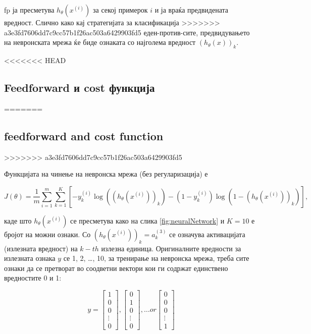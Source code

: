 fp ја пресметува $h_\theta(x^{(i)})$ за секој примерок $i$ и ја враќа
предвидената вредност. Слично како кај стратегијата за класификација
>>>>>>> a3e3fd7606dd7c9cc57b1f26ac503a6429903fd5
еден-против-сите, предвидувањето на невронската мрежа ќе биде ознаката со
најголема вредност $(h_\theta(x))_k$.




<<<<<<< HEAD
\subsection{Feedforward и cost функција}
=======
\subsection{feedforward and cost function}
>>>>>>> a3e3fd7606dd7c9cc57b1f26ac503a6429903fd5

Функцијата на чинење на невронска мрежа (без регуларизација) е

\[
	J(\theta) = \frac{1}{m}\sum_{i = 1}^{m}\sum_{k =
	1}^{K}[-y^{(i)}_k\log((h_\theta(x^{(i)}))_k) -
	(1 - y^{(i)}_k)\log(1 - (h_\theta(x^{(i)}))_k)],
\]

каде што $h_\theta(x^{(i)})$ се пресметува како на слика \ref{fig:neuralNetwork}
 и $K = 10$ е бројот на можни ознаки. Со $(h_\theta(x^{(i)}))_k = a^{(3)}_k$ се
 означува активацијата (излезната вредност) на $k-th$ излезна единица.
 Оригиналните вредности за излезната ознака $y$ се 1, 2, \ldots, 10, за
 тренирање на невронска мрежа, треба сите ознаки да се претворат во соодветни
 вектори кои ги содржат единствено вредностите 0 и 1:
 
 \[	
	y = \begin{bmatrix}
		    1 \\
			0 \\
			0 \\
			\vdots \\
			0
			
		\end{bmatrix},
		\begin{bmatrix}
		    0 \\
			1 \\
			0 \\
			\vdots \\
			0
			
		\end{bmatrix},
		\ldots
		or
		\begin{bmatrix}
		    0 \\
			0 \\
			0 \\
			\vdots \\
			1
			
		\end{bmatrix}
 \]

